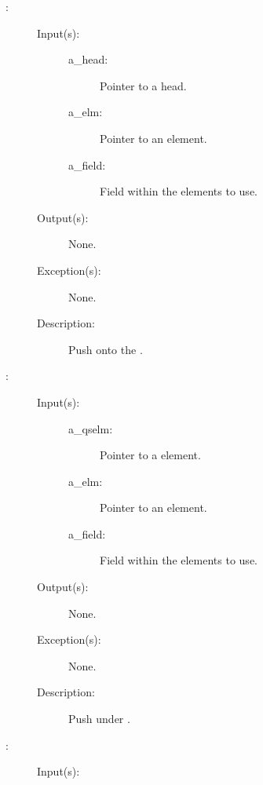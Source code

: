 \begin{description}
\item[{}: ]
	\begin{description}\item[]
	\item[Input(s): ]
		\begin{description}\item[]
		\item[a\_head: ]
			Pointer to a  head.
		\item[a\_elm: ]
			Pointer to an element.
		\item[a\_field: ]
			Field within the  elements to use.
		\end{description}
	\item[Output(s): ] None.
	\item[Exception(s): ] None.
	\item[Description: ]
		Push  onto the .
	\end{description}
\label{qs_under_push}
\item[{}: ]
	\begin{description}\item[]
	\item[Input(s): ]
		\begin{description}\item[]
		\item[a\_qselm: ]
			Pointer to a  element.
		\item[a\_elm: ]
			Pointer to an element.
		\item[a\_field: ]
			Field within the  elements to use.
		\end{description}
	\item[Output(s): ] None.
	\item[Exception(s): ] None.
	\item[Description: ]
		Push  under .
	\end{description}
\label{qs_pop}
\item[{}: ]
	\begin{description}\item[]
	\item[Input(s): ]

\end{description}
\end{description}
